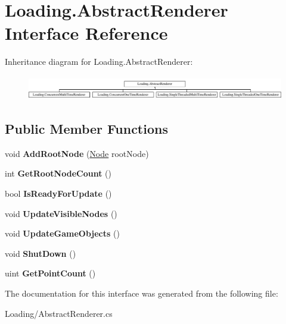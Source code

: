 \hypertarget{interface_loading_1_1_abstract_renderer}{}\section{Loading.\+Abstract\+Renderer Interface Reference}
\label{interface_loading_1_1_abstract_renderer}
Inheritance diagram for Loading.\+Abstract\+Renderer\+:\begin{figure}[H]
\begin{center}
\leavevmode
\includegraphics[height=1.060606cm]{interface_loading_1_1_abstract_renderer}
\end{center}
\end{figure}
\subsection*{Public Member Functions}
\begin{DoxyCompactItemize}
\item 
\mbox{\label{interface_loading_1_1_abstract_renderer_a107159ee09c733ea8205fe47f8fac216}} 
void {\bfseries Add\+Root\+Node} (\hyperlink{class_cloud_data_1_1_node}{Node} root\+Node)
\item 
\mbox{\label{interface_loading_1_1_abstract_renderer_ae6d660153792a10c7633f82be5010542}} 
int {\bfseries Get\+Root\+Node\+Count} ()
\item 
\mbox{\label{interface_loading_1_1_abstract_renderer_a70e3721f67340976d72dd11cabdf4e4b}} 
bool {\bfseries Is\+Ready\+For\+Update} ()
\item 
\mbox{\label{interface_loading_1_1_abstract_renderer_a0dbb8f2b8ad9ba83be923374bcdeda57}} 
void {\bfseries Update\+Visible\+Nodes} ()
\item 
\mbox{\label{interface_loading_1_1_abstract_renderer_ab78d3e23e2a4aea1f23337c661f11c54}} 
void {\bfseries Update\+Game\+Objects} ()
\item 
\mbox{\label{interface_loading_1_1_abstract_renderer_a005c3f95523559e7aece3f6bd88c6d0c}} 
void {\bfseries Shut\+Down} ()
\item 
\mbox{\label{interface_loading_1_1_abstract_renderer_a15b34dc6212c0d72c9e9837e0dd94391}} 
uint {\bfseries Get\+Point\+Count} ()
\end{DoxyCompactItemize}


The documentation for this interface was generated from the following file\+:\begin{DoxyCompactItemize}
\item 
Loading/Abstract\+Renderer.\+cs\end{DoxyCompactItemize}
